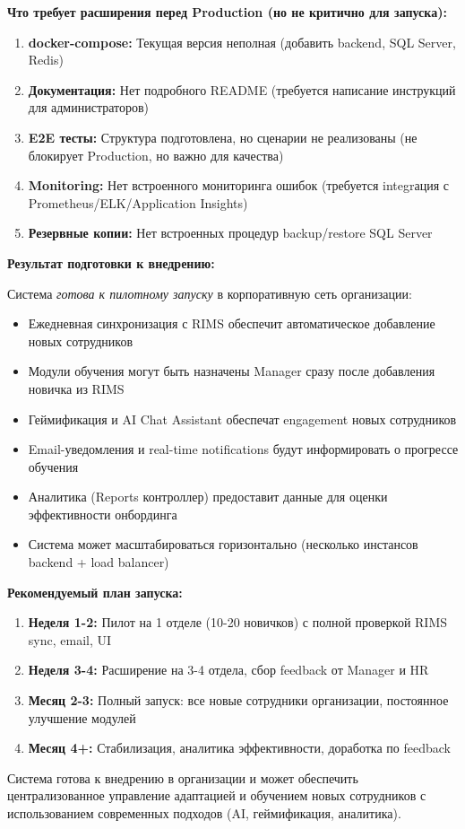 \textbf{Что требует расширения перед Production (но не критично для запуска):}

\begin{enumerate}
	\item \textbf{docker-compose:} Текущая версия неполная (добавить backend, SQL Server, Redis)
	\item \textbf{Документация:} Нет подробного README (требуется написание инструкций для администраторов)
	\item \textbf{E2E тесты:} Структура подготовлена, но сценарии не реализованы (не блокирует Production, но важно для качества)
	\item \textbf{Monitoring:} Нет встроенного мониторинга ошибок (требуется integrация с Prometheus/ELK/Application Insights)
	\item \textbf{Резервные копии:} Нет встроенных процедур backup/restore SQL Server
\end{enumerate}

\textbf{Результат подготовки к внедрению:}

Система \emph{готова к пилотному запуску} в корпоративную сеть организации:

\begin{itemize}
	\item Ежедневная синхронизация с RIMS обеспечит автоматическое добавление новых сотрудников
	\item Модули обучения могут быть назначены Manager сразу после добавления новичка из RIMS
	\item Геймификация и AI Chat Assistant обеспечат engagement новых сотрудников
	\item Email-уведомления и real-time notifications будут информировать о прогрессе обучения
	\item Аналитика (Reports контроллер) предоставит данные для оценки эффективности онбординга
	\item Система может масштабироваться горизонтально (несколько инстансов backend + load balancer)
\end{itemize}

\textbf{Рекомендуемый план запуска:}

\begin{enumerate}
	\item \textbf{Неделя 1-2:} Пилот на 1 отделе (10-20 новичков) с полной проверкой RIMS sync, email, UI
	\item \textbf{Неделя 3-4:} Расширение на 3-4 отдела, сбор feedback от Manager и HR
	\item \textbf{Месяц 2-3:} Полный запуск: все новые сотрудники организации, постоянное улучшение модулей
	\item \textbf{Месяц 4+:} Стабилизация, аналитика эффективности, доработка по feedback
\end{enumerate}

Система готова к внедрению в организации и может обеспечить централизованное управление адаптацией и обучением новых сотрудников с использованием современных подходов (AI, геймификация, аналитика).
